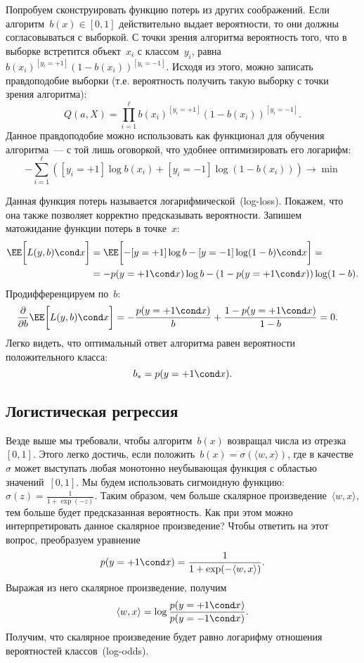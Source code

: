 \documentclass[12pt,fleqn]{article}
\begin{document}
Попробуем сконструировать функцию потерь из других соображений.
Если алгоритм~$b(x) \in [0, 1]$ действительно выдает вероятности, то
они должны согласовываться с выборкой.
С точки зрения алгоритма вероятность того, что в выборке встретится объект~$x_i$ с классом~$y_i$,
равна~$b(x_i)^{[y_i = +1]} (1 - b(x_i))^{[y_i = -1]}$.
Исходя из этого, можно записать правдоподобие выборки (т.е. вероятность получить такую выборку
с точки зрения алгоритма):
\[
    Q(a, X)
    =
    \prod_{i = 1}^{\ell}
        b(x_i)^{[y_i = +1]} (1 - b(x_i))^{[y_i = -1]}.
\]
Данное правдоподобие можно использовать как функционал для обучения алгоритма~---
с той лишь оговоркой, что удобнее оптимизировать его логарифм:
\[
    -\sum_{i = 1}^{\ell} \left(
        [y_i = +1] \log b(x_i)
        +
        [y_i = -1] \log (1 - b(x_i))
    \right)
    \to
    \min
\]

Данная функция потерь называется логарифмической~(log-loss).
Покажем, что она также позволяет корректно предсказывать вероятности.
Запишем матожидание функции потерь в точке~$x$:
\begin{align*}
    \EE \biggl[
        L(y, b)
        \cond
        x
    \biggr]
    &=
    \EE \biggl[
        -[y = +1] \log b - [y = -1] \log(1 - b)
        \cond
        x
    \biggr]
    =\\
    &=
    -p(y = +1 \cond x) \log b
    -
    (1 - p(y = +1 \cond x)) \log(1 - b).
\end{align*}
Продифференцируем по~$b$:
\begin{align*}
    \frac{\partial}{\partial b}
    \EE \biggl[
        L(y, b)
        \cond
        x
    \biggr]
    &=
    -\frac{p(y = +1 \cond x)}{b} + \frac{1 - p(y = +1 \cond x)}{1 - b}
    =
    0.
\end{align*}
Легко видеть, что оптимальный ответ алгоритма равен вероятности положительного класса:
\[
    b_* = p(y = +1 \cond x).
\]

\subsection{Логистическая регрессия}
Везде выше мы требовали, чтобы алгоритм~$b(x)$ возвращал числа из отрезка~$[0, 1]$.
Этого легко достичь, если положить~$b(x) = \sigma(\langle w, x \rangle)$,
где в качестве~$\sigma$ может выступать любая монотонно неубывающая функция
с областью значений~$[0, 1]$.
Мы будем использовать сигмоидную функцию: $\sigma(z) = \frac{1}{1 + \exp(-z)}$.
Таким образом, чем больше скалярное произведение~$\langle w, x \rangle$,
тем больше будет предсказанная вероятность.
Как при этом можно интерпретировать данное скалярное произведение?
Чтобы ответить на этот вопрос, преобразуем уравнение
\[
    p(y = +1 \cond x)
    =
    \frac{1}{1 + \exp(-\langle w, x \rangle)}.
\]
Выражая из него скалярное произведение, получим
\[
    \langle w, x \rangle
    =
    \log
    \frac{
        p(y = +1 \cond x)
    }{
        p(y = -1 \cond x)
    }.
\]
Получим, что скалярное произведение будет равно логарифму отношения
вероятностей классов~(log-odds).
\end{document}
